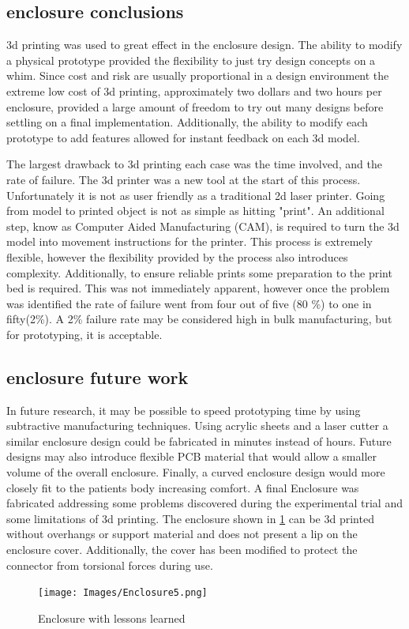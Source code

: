 \subsection{enclosure conclusions}
3d printing was used to great effect in the enclosure design. The ability to modify a physical prototype provided the flexibility to just try design concepts on a whim. Since cost and risk are usually proportional in a design environment the extreme low cost of 3d printing, approximately two dollars and two hours per enclosure, provided a large amount of freedom to try out many designs before settling on a final implementation. Additionally, the ability to modify each prototype to add features allowed for instant feedback on each 3d model. 

The largest drawback to 3d printing each case was the time involved, and the rate of failure. The 3d printer was a new tool at the start of this process. Unfortunately it is not as user friendly as a traditional 2d laser printer. Going from model to printed object is not as simple as hitting "print". An additional step, know as Computer Aided Manufacturing (CAM), is required to turn the 3d model into movement instructions for the printer. This process is extremely flexible, however the flexibility provided by the process also introduces complexity. Additionally, to ensure reliable prints some preparation to the print bed is required. This was not immediately apparent, however once the problem was identified the rate of failure went from four out of five (80 \%) to one in fifty(2\%). A 2\% failure rate may be considered high in bulk manufacturing, but for prototyping, it is acceptable.




\subsection{enclosure future work}
In future research, it may be possible to speed prototyping time by using subtractive manufacturing techniques. Using acrylic sheets and a laser cutter a similar enclosure design could be fabricated in minutes instead of hours. Future designs may also introduce flexible PCB material that would allow a smaller volume of the overall enclosure. Finally, a curved enclosure design would more closely fit to the patients body increasing comfort. A final Enclosure was fabricated addressing some problems discovered during the experimental trial and some limitations of 3d printing. The enclosure shown in \cref{fig:enclosure5} can be 3d printed without overhangs or support material and does not present a lip on the enclosure cover. Additionally, the cover has been modified to protect the  connector from torsional forces during use.



\begin{figure}[h]
 \begin{center}
  \label{fig:enclosure5}
  \texttt{[image: Images/Enclosure5.png]} 
  \caption{Enclosure with lessons learned} 
 \end{center}
\end{figure}



